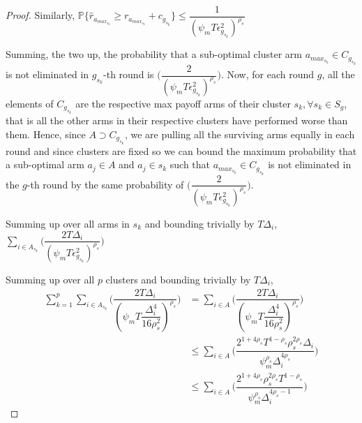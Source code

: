 \begin{proof}
 
Similarly, $\mathbb{P}\lbrace\hat{r}_{a_{max_{s_{k}}}}\geq r_{a_{max_{s_{k}}}} + c_{g_{s_{k}}}\rbrace\leq \dfrac{1}{(\psi_{m}T\epsilon_{g_{s_{k}}}^{2})^{\rho_{s}}}$
 
Summing, the two up, the probability that a sub-optimal cluster arm $a_{max_{s_{k}}}\in C_{g_{s_{k}}}$ is not eliminated in $g_{s_{k}}$-th round is  $\bigg(\dfrac{2}{(\psi_{m}T\epsilon_{g_{s_{k}}}^{2})^{\rho_{s}}}\bigg)$. 
  Now, for each round $g$, all the elements of $C_{g_{s_{k}}}$ are the respective max payoff arms of their cluster $s_{k}, \forall s_{k}\in S_{g}$, that is all the other arms in their respective clusters have performed worse than them. Hence, since $A\supset C_{g_{s_{k}}}$, we are pulling all the surviving arms equally in each round and since clusters are fixed so we can bound the maximum probability that a sub-optimal arm $a_{j}\in A$  and $a_{j}\in s_{k}$ such that $a_{max_{s_{k}}}\in C_{g_{s_{k}}}$ is not eliminated in the $g$-th round by the same probability of $\bigg(\dfrac{2}{(\psi_{m}T\epsilon_{g_{s_{k}}}^{2})^{\rho_{s}}}\bigg)$. 
 
Summing up over all arms in $s_{k}$ and bounding trivially by $T\Delta_{i}$,
$\sum_{i\in A_{s_{k}}}\bigg(\dfrac{2T\Delta_{i}}{(\psi_{m}T\epsilon_{g_{s_{k}}}^{2})^{\rho_{s}}}\bigg)$
 
Summing up over all $p$ clusters and bounding trivially by $T\Delta_{i}$,
 \begin{align*}
 \sum_{k=1}^{p}\sum_{i\in A_{s_{k}}}\bigg(\dfrac{2T\Delta_{i}}{(\psi_{m}T\dfrac{\Delta_{i}^{4}}{16\rho_{s}^{2}})^{\rho_{s}}}\bigg) &= \sum_{i\in A}\bigg(\dfrac{2T\Delta_{i}}{(\psi_{m}T\dfrac{\Delta_{i}^{4}}{16\rho_{s}^{2}})^{\rho_{s}}}\bigg) \\
 &\leq \sum_{i\in A}\bigg(\dfrac{2^{1+4\rho_{s}}T^{1-\rho_{s}}\rho_{s}^{2\rho_{s}}\Delta_{i}}{\psi_{m}^{\rho_{s}}\Delta_{i}^{4\rho_{s}}}\bigg)\\
 &\leq \sum_{i\in A}\bigg(\dfrac{2^{1+4\rho_{s}}\rho_{s}^{2\rho_{s}}T^{1-\rho_{s}}}{\psi_{m}^{\rho_{s}}\Delta_{i}^{4\rho_{s}-1}}\bigg)
 \end{align*}


\end{proof}
